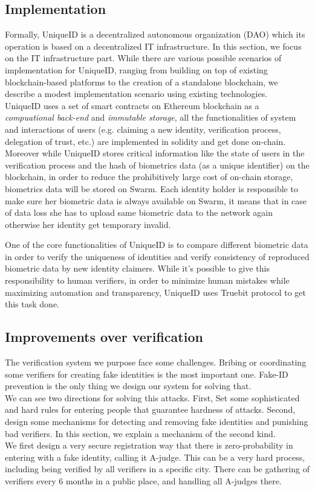 \documentclass[conference]{IEEEtran}
\begin{document}
\subsection{Implementation}
Formally, UniqueID is a decentralized autonomous organization (DAO) which its operation is based on a decentralized IT infrastructure. In this section, we focus on the IT infrastructure part. While there are various possible scenarios of implementation for UniqueID, ranging from building on top of existing blockchain-based platforms to the creation of a standalone blockchain, we describe a modest implementation scenario using existing technologies.\\

UniqueID uses a set of smart contracts on Ethereum blockchain as a \textit{compuational back-end} and \textit{immutable storage}, all the functionalities of system and interactions of users (e.g. claiming a new identity, verification process, delegation of trust, etc.) are implemented in solidity and get done on-chain. Moreover while UniqueID stores critical information like the state of users in the verification process and the hash of biometrics data (as a unique identifier) on the blockchain, in order to reduce the prohibitively large cost of on-chain storage, biometrics data will be stored on Swarm. Each identity holder is responsible to make sure her biometric data is always available on Swarm, it means that in case of data loss she has to upload same biometric data to the network again otherwise her identity get temporary invalid.

One of the core functionalities of UniqueID is to compare different biometric data in order to verify the uniqueness of identities and verify consistency of reproduced biometric data by new identity claimers. While it's possible to give this responsibility to human verifiers, in order to minimize human mistakes while maximizing automation and transparency, UniqueID uses Truebit \cite{Truebit} protocol to get this task done. 

\subsection{Improvements over verification}
The verification system we purpose face some challenges. Bribing or coordinating some verifiers for creating fake identities is the most important one. Fake-ID prevention is the only thing we design our system for solving that. \\
We can see two directions for solving this attacks. First, Set some sophisticated and hard rules for entering people that guarantee hardness of attacks. Second, design some mechanisms for detecting and removing fake identities and punishing bad verifiers. In this section, we explain a mechanism of the second kind. \\
We first design a very secure registration way that there is zero-probability in entering with a fake identity, calling it A-judge. This can be a very hard process, including being verified by all verifiers in a specific city. There can be gathering of verifiers every 6 months in a public place, and handling all A-judges there.
\end{document}
